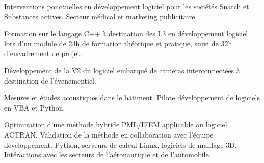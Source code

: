 \documentclass[10pt,a4paper]{altacv}
\begin{document}


\begin{fullwidth}
\makecvheader
\end{fullwidth}




Interventions ponctuelles en d\'eveloppement logiciel pour les soci\'et\'es Snatch et Substances actives.
Secteur m\'edical et marketing publicitaire.\linebreak
\divider

Formation sur le langage C++ \`a destination des L3 en d\'eveloppement logiciel lors d'un module de 24h de formation th\'eorique et pratique, suivi de 32h d'encadrement de projet.\linebreak
\divider

D\'eveloppement de la V2 du logiciel embarqu\'e de cam\'eras interconnect\'ees \`a destination de l'\'evenementiel.\linebreak
\divider

Mesures et \'etudes acoustiques dans le b\^atiment. Pilote d\'eveloppement de logiciels en VBA et Python.\linebreak
\divider

Optimisation d'une m\'ethode hybride PML/IFEM applicable au logiciel ACTRAN.\linebreak
Validation de la m\'ethode en collaboration avec l'\'equipe d\'eveloppement. Python, serveurs de calcul Linux, logiciels de maillage 3D.
Int\'eractions avec les secteurs de l'a\'eronautique et de l'automobile.\linebreak
\divider
\end{document}

